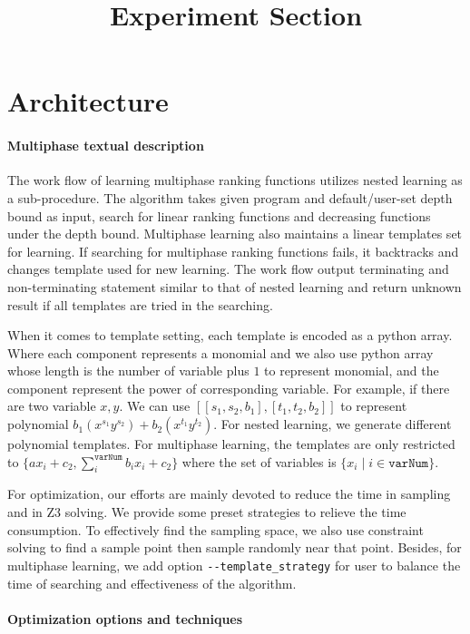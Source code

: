 \documentclass[UTF-8]{article}
\title{Experiment Section}
\begin{document}
\maketitle

\section{Architecture}
\paragraph{Multiphase textual description}

The work flow of learning multiphase ranking functions utilizes nested learning as a sub-procedure. The algorithm takes given program and default/user-set depth bound as input, search for linear ranking functions and decreasing functions under the depth bound. Multiphase learning also maintains a linear templates set for learning. If searching for multiphase ranking functions fails, it backtracks and changes template used for new learning. The work flow output terminating and non-terminating statement similar to that of nested learning and return unknown result if all templates are tried in the searching.

When it comes to template setting, each template is encoded as a python array. Where each component represents a monomial and we also use python array whose length is the number of variable plus $1$ to represent monomial, and the component represent the power of corresponding variable. For example, if there are two variable $x, y$. We can use $[[s_1,s_2,b_1],[t_1,t_2,b_2]]$ to represent polynomial $b_1(x^{s_1}y^{s_2}) + b_2(x^{t_1}y^{t_2})$. For nested learning, we generate different polynomial templates. For multiphase learning, the templates are only restricted to $\{ax_i + c_2, \sum_{i}^{\texttt{varNum}}b_ix_i + c_2\}$ where the set of variables is $\{x_i\mid i\in \texttt{varNum}\}$.


For optimization, our efforts are mainly devoted to reduce the time in sampling and in Z3 solving. We provide some preset strategies to relieve the time consumption. To effectively find the sampling space, we also use constraint solving to find a sample point then sample randomly near that point. Besides, for multiphase learning, we add option \verb|--template_strategy| for user to balance the time of searching and effectiveness of the algorithm. 

\paragraph{Optimization options and techniques}
\end{document}
